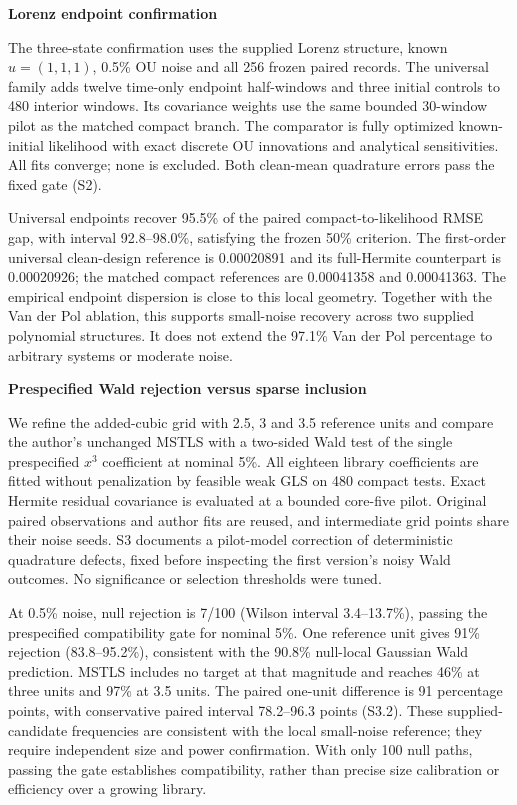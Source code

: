 \documentclass[
  american,
  11pt,
]{article}
\newcounter{none} %
\begin{document}
\textbf{Lorenz endpoint confirmation}

The three-state confirmation uses the supplied Lorenz structure, known
\(u=(1,1,1)\), 0.5\% OU noise and all 256 frozen paired records. The
universal family adds twelve time-only endpoint half-windows and three
initial controls to 480 interior windows. Its covariance weights use the
same bounded 30-window pilot as the matched compact branch. The
comparator is fully optimized known-initial likelihood with exact
discrete OU innovations and analytical sensitivities. All fits converge;
none is excluded. Both clean-mean quadrature errors pass the fixed gate
(S2).

Universal endpoints recover 95.5\% of the paired compact-to-likelihood
RMSE gap, with interval 92.8--98.0\%, satisfying the frozen 50\%
criterion. The first-order universal clean-design reference is
0.00020891 and its full-Hermite counterpart is 0.00020926; the matched
compact references are 0.00041358 and 0.00041363. The empirical endpoint
dispersion is close to this local geometry. Together with the Van der
Pol ablation, this supports small-noise recovery across two supplied
polynomial structures. It does not extend the 97.1\% Van der Pol
percentage to arbitrary systems or moderate noise.

\textbf{Prespecified Wald rejection versus sparse inclusion}

We refine the added-cubic grid with 2.5, 3 and 3.5 reference units and
compare the author's unchanged MSTLS with a two-sided Wald test of the
single prespecified \(x^3\) coefficient at nominal 5\%. All eighteen
library coefficients are fitted without penalization by feasible weak
GLS on 480 compact tests. Exact Hermite residual covariance is evaluated
at a bounded core-five pilot. Original paired observations and author
fits are reused, and intermediate grid points share their noise seeds.
S3 documents a pilot-model correction of deterministic quadrature
defects, fixed before inspecting the first version's noisy Wald
outcomes. No significance or selection thresholds were tuned.

At 0.5\% noise, null rejection is 7/100 (Wilson interval 3.4--13.7\%),
passing the prespecified compatibility gate for nominal 5\%. One
reference unit gives 91\% rejection (83.8--95.2\%), consistent with the
90.8\% null-local Gaussian Wald prediction. MSTLS includes no target at
that magnitude and reaches 46\% at three units and 97\% at 3.5 units.
The paired one-unit difference is 91 percentage points, with
conservative paired interval 78.2--96.3 points (S3.2). These
supplied-candidate frequencies are consistent with the local small-noise
reference; they require independent size and power confirmation. With
only 100 null paths, passing the gate establishes compatibility, rather
than precise size calibration or efficiency over a growing library.
\end{document}
